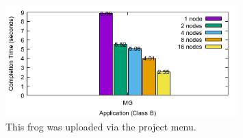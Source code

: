 \documentclass[a4paper]{article}
\begin{document}
\begin{figure}[H]
\centering
\includegraphics[width=0.8\textwidth]{figures/MGvB.png}
\caption{\label{fig:MGvB}This frog was uploaded via the project menu.}
\end{figure}



\end{document}
